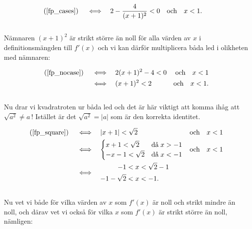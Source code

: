 \documentclass{article}
\begin{document}
\begin{align}
  \text{(\ref{fp_cases})} \quad \iff \quad & 2 - \frac{4}{(x+1)^{2}} < 0 \quad \text{och} \quad x < 1\text{.} \label{fp_nocase}
\end{align}
\\
Nämnaren $(x + 1)^{2}$ är strikt större än noll för alla värden av $x$ i definitionsmängden till $f'(x)$ och vi kan därför multiplicera båda led i olikheten med nämnaren:

\begin{align}
  \text{(\ref{fp_nocase})} \quad \iff \quad & 2(x + 1)^{2} - 4 < 0 & \text{och} \quad x < 1 \notag \\
  \iff \quad & (x + 1)^{2} < 2 & \text{och} \quad x < 1\text{.} \label{fp_square}
\end{align}
\\
Nu drar vi kvadratroten ur båda led och det är här viktigt att komma ihåg att $\sqrt{a^{2}} \neq a\,$! Istället är det $\sqrt{a^{2}} = |a|$ som är den korrekta identitet.

\begin{align*}
  \text{(\ref{fp_square})} \quad \iff \quad & |x + 1| < \sqrt{2} & \text{och} \quad x < 1 \\
  \iff \quad &
               \begin{aligned}
                 \begin{cases}
                   x + 1 < \sqrt{2} & \text{då} \; x > - 1 \\
                   -x -1 < \sqrt{2} & \text{då} \; x < - 1
                 \end{cases}
               \end{aligned}
  & \text{och} \quad x < 1\\
  \iff \quad &
              \begin{aligned}
                -1 &< x < \sqrt{2} - 1 \\
                -1 -\sqrt{2} &< x < - 1\text{.}
              \end{aligned}
\end{align*}
\\
Nu vet vi både för vilka värden av $x$ som $f'(x)$ är noll och strikt mindre än noll, och därav vet vi också för vilka $x$ som $f'(x)$ är strikt större än noll, nämligen:
\end{document}
